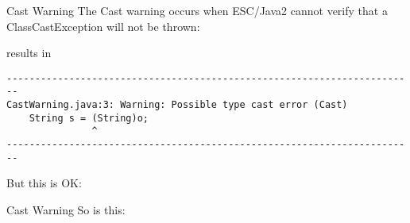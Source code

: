 \documentclass[
pdf,
nocolorBG,
slideColor,
cok,
]{prosper}
\begin{document}
\begin{slide}{Cast Warning}
\vspace*{-9ex}
The Cast warning occurs when ESC/Java2 cannot verify that a ClassCastException will not be thrown:
\begin{figure*}
\tiny

\end{figure*}
results in
{\tiny
\begin{verbatim}
------------------------------------------------------------------------
CastWarning.java:3: Warning: Possible type cast error (Cast)
    String s = (String)o;
               ^
------------------------------------------------------------------------
\end{verbatim}
}
But this is OK:
\begin{figure*}
\tiny

\end{figure*}

\end{slide}

\begin{slide}{Cast Warning}
So is this:
\begin{figure*}
\tiny

\end{figure*}

\end{slide}
\end{document}
